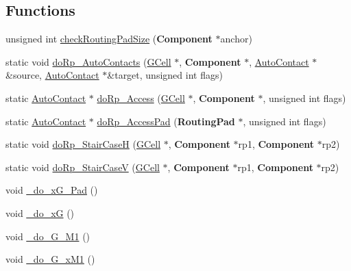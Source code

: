 \subsection*{Functions}
\begin{DoxyCompactItemize}
\item 
unsigned int \hyperlink{group__LoadGlobalRouting_gaad5d32b07d1d53ecc8642e4b10df9605}{check\-Routing\-Pad\-Size} ({\bf Component} $\ast$anchor)
\item 
static void \hyperlink{group__LoadGlobalRouting_gae9cae408ea16a3f7c77c3d75f0242f19}{do\-Rp\-\_\-\-Auto\-Contacts} (\hyperlink{classKatabatic_1_1GCell}{G\-Cell} $\ast$, {\bf Component} $\ast$, \hyperlink{classKatabatic_1_1AutoContact}{Auto\-Contact} $\ast$\&source, \hyperlink{classKatabatic_1_1AutoContact}{Auto\-Contact} $\ast$\&target, unsigned int flags)
\item 
static \hyperlink{classKatabatic_1_1AutoContact}{Auto\-Contact} $\ast$ \hyperlink{group__LoadGlobalRouting_gada6d3c694b8d741b6504b7c3da166357}{do\-Rp\-\_\-\-Access} (\hyperlink{classKatabatic_1_1GCell}{G\-Cell} $\ast$, {\bf Component} $\ast$, unsigned int flags)
\item 
static \hyperlink{classKatabatic_1_1AutoContact}{Auto\-Contact} $\ast$ \hyperlink{group__LoadGlobalRouting_ga60edeea78b56db072fc26a58a7afbcd4}{do\-Rp\-\_\-\-Access\-Pad} ({\bf Routing\-Pad} $\ast$, unsigned int flags)
\item 
static void \hyperlink{group__LoadGlobalRouting_ga3291d84592215974fe4052c00304bdb1}{do\-Rp\-\_\-\-Stair\-Case\-H} (\hyperlink{classKatabatic_1_1GCell}{G\-Cell} $\ast$, {\bf Component} $\ast$rp1, {\bf Component} $\ast$rp2)
\item 
static void \hyperlink{group__LoadGlobalRouting_ga6361fb0e90f35cd59063a1ee971ef2a9}{do\-Rp\-\_\-\-Stair\-Case\-V} (\hyperlink{classKatabatic_1_1GCell}{G\-Cell} $\ast$, {\bf Component} $\ast$rp1, {\bf Component} $\ast$rp2)
\item 
void \hyperlink{group__LoadGlobalRouting_gabe00ab10a0dab8a3d2de0709e61e4e7d}{\-\_\-do\-\_\-x\-G\-\_\-Pad} ()
\item 
void \hyperlink{group__LoadGlobalRouting_gaaa6d4ccd2eadfb6bc3e2cc98cfaf2cca}{\-\_\-do\-\_\-x\-G} ()
\item 
void \hyperlink{group__LoadGlobalRouting_gad24a03e87e269f16dcc28d8c2d9f1cfb}{\-\_\-do\-\_\-G\-\_\-M1} ()
\item 
void \hyperlink{group__LoadGlobalRouting_ga97942453a1bc5b01106aa380271fd7fc}{\-\_\-do\-\_\-G\-\_\-x\-M1} ()
\item 

\end{DoxyCompactItemize}
